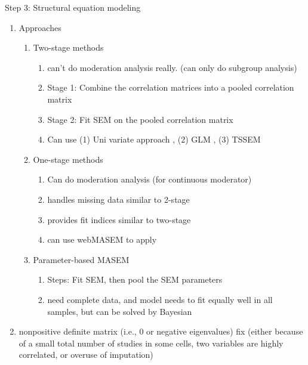 \documentclass[
]{book}
\providecommand{\tightlist}{%
  \setlength{\itemsep}{0pt}\setlength{\parskip}{0pt}}
\begin{document}
Step 3: Structural equation modeling

\begin{enumerate}
\def\labelenumi{\arabic{enumi}.}
\tightlist
\item
  Approaches

  \begin{enumerate}
  \def\labelenumii{\arabic{enumii}.}
  \item
    Two-stage methods \citep{cheung2005meta}

    \begin{enumerate}
    \def\labelenumiii{\arabic{enumiii}.}
    \tightlist
    \item
      can't do moderation analysis really. (can only do subgroup analysis)
    \item
      Stage 1: Combine the correlation matrices into a pooled correlation matrix
    \item
      Stage 2: Fit SEM on the pooled correlation matrix
    \item
      Can use (1) Uni variate approach \citep{hunter1990}, (2) GLM \citep{becker1992}, (3) TSSEM \citep{cheung2005meta}
    \end{enumerate}
  \item
    One-stage methods \citep{jak2020meta}

    \begin{enumerate}
    \def\labelenumiii{\arabic{enumiii}.}
    \item
      Can do moderation analysis (for continuous moderator)
    \item
      handles missing data similar to 2-stage
    \item
      provides fit indices similar to two-stage
    \item
      can use webMASEM to apply
    \end{enumerate}
  \item
    Parameter-based MASEM \citep{becker2007synthesis, gnambs2016parameter}

    \begin{enumerate}
    \def\labelenumiii{\arabic{enumiii}.}
    \item
      Steps: Fit SEM, then pool the SEM parameters
    \item
      need complete data, and model needs to fit equally well in all samples, but can be solved by Bayesian \citep{ke2019bayesian}
    \end{enumerate}
  \end{enumerate}
\item
  nonpositive definite matrix (i.e., 0 or negative eigenvalues) fix (either because of a small total number of studies in some cells, two variables are highly correlated, or overuse of imputation)


\end{enumerate}
\end{document}
